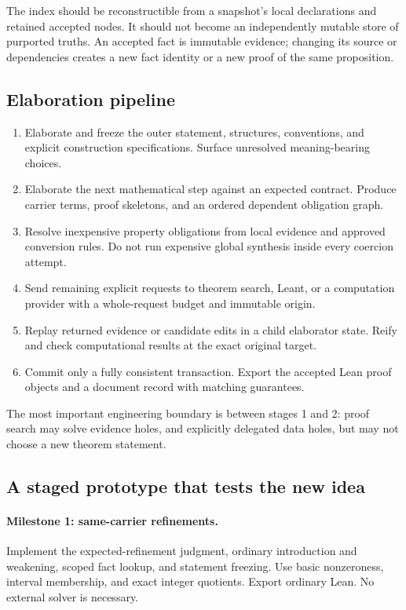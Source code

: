 \documentclass[11pt,letterpaper]{article}
\theoremstyle{definition}\newtheorem{definition}[theorem]{Definition}
\begin{document}
The index should be reconstructible from a snapshot's local declarations and retained accepted nodes. It should not become an independently mutable store of purported truths. An accepted fact is immutable evidence; changing its source or dependencies creates a new fact identity or a new proof of the same proposition.

\subsection{Elaboration pipeline}
\begin{enumerate}[label=\arabic*.]
\item Elaborate and freeze the outer statement, structures, conventions, and explicit construction specifications. Surface unresolved meaning-bearing choices.
\item Elaborate the next mathematical step against an expected contract. Produce carrier terms, proof skeletons, and an ordered dependent obligation graph.
\item Resolve inexpensive property obligations from local evidence and approved conversion rules. Do not run expensive global synthesis inside every coercion attempt.
\item Send remaining explicit requests to theorem search, Leant, or a computation provider with a whole-request budget and immutable origin.
\item Replay returned evidence or candidate edits in a child elaborator state. Reify and check computational results at the exact original target.
\item Commit only a fully consistent transaction. Export the accepted Lean proof objects and a document record with matching guarantees.
\end{enumerate}
The most important engineering boundary is between stages 1 and 2: proof search may solve evidence holes, and explicitly delegated data holes, but may not choose a new theorem statement.

\subsection{A staged prototype that tests the new idea}
\paragraph{Milestone 1: same-carrier refinements.}
Implement the expected-refinement judgment, ordinary introduction and weakening, scoped fact lookup, and statement freezing. Use basic nonzeroness, interval membership, and exact integer quotients. Export ordinary Lean. No external solver is necessary.
\end{document}

